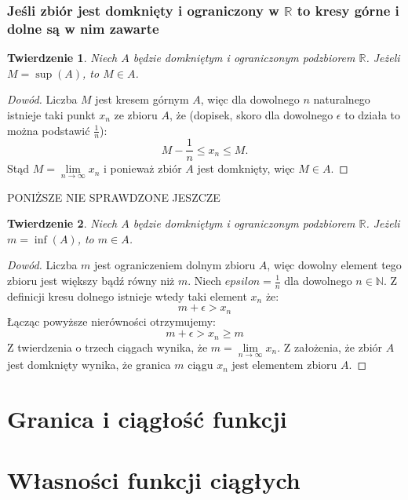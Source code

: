 \documentclass{article}
\newtheorem*{theorem}{Twierdzenie}
\begin{document}
\subsubsection{Jeśli zbiór jest domknięty i ograniczony w \(\mathbb{R}\) to kresy górne i dolne są w nim zawarte}
\begin{theorem}
    Niech \(A\) będzie domkniętym i ograniczonym podzbiorem \(\mathbb{R}\). Jeżeli \(M = \sup(A)\), to 
    \(M \in A\).
\end{theorem}
\begin{proof}[Dowód]
    Liczba \(M\) jest kresem górnym \(A\), więc dla dowolnego \(n\) naturalnego istnieje taki
    punkt \(x_n\) ze zbioru \(A\), że (dopisek, skoro dla dowolnego \(\epsilon\) to działa to można podstawić \(\frac{1}{n}\)):
    \begin{equation*}
        M - \frac{1}{n} \leq x_n \leq M.
    \end{equation*}
    Stąd \(M = \lim\limits_{n \to \infty} x_n\) i ponieważ zbiór \(A\) jest domknięty, więc \(M \in A\).
\end{proof}
\begin{center}
    PONIŻSZE NIE SPRAWDZONE JESZCZE
\end{center}
\begin{theorem}
    Niech \(A\) będzie domkniętym i ograniczonym podzbiorem \(\mathbb{R}\). Jeżeli \(m = \inf(A)\), to 
    \(m \in A\).
\end{theorem}
\begin{proof}[Dowód]
    Liczba \(m\) jest ograniczeniem dolnym zbioru \(A\), więc dowolny element tego zbioru jest większy bądź równy niż
    \(m\). Niech \(epsilon = \frac{1}{n}\) dla dowolnego \(n \in \mathbb{N}\). 
    Z definicji kresu dolnego istnieje wtedy taki element \(x_n\) że:
    \begin{equation*}
        m + \epsilon > x_n
    \end{equation*}
    Łącząc powyższe nierówności otrzymujemy:
    \begin{equation*}
        m + \epsilon > x_n \geq m
    \end{equation*}
    Z twierdzenia o trzech ciągach wynika, że \(m = \lim\limits_{n \to \infty} x_n\). Z założenia, że zbiór \(A\) jest
    domknięty wynika, że granica \(m\) ciągu \(x_n\) jest elementem zbioru \(A\).
\end{proof}

\section{Granica i ciągłość funkcji}
\section{Własności funkcji ciągłych}
\end{document}
